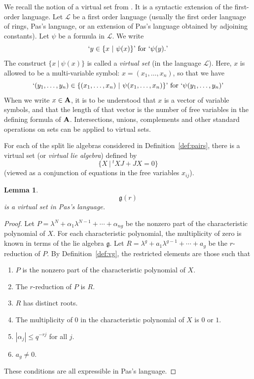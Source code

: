 \documentclass[11pt]{amsart}
\newtheorem{lemma}[theorem]{Lemma}
\theoremstyle{definition}
\theoremstyle{remark}
\numberwithin{equation}{theorem}
\def\calL{{\mathcal{L}}}
\def\tq{{\ \vert\ }}
\def\lie#1{{\mathfrak{#1}}}
\def\liegood#1{{\lie#1}}
\def\rq{\text{'}}
\begin{document}
We recall the notion of a virtual set from \cite{VTF}.  It is a
syntactic extension of the first-order language.  Let $\calL$ be a
first order language (usually the first order language of rings,
Pas's language, or an extension of Pas's language obtained by
adjoining constants).  Let $\psi$ be a formula in $\calL$. We
write
    \begin{equation}`y\in \{x \tq \psi(x)\}\rq \text{ for }
`\psi(y).\rq\end{equation} The construct $\{x\tq \psi(x)\}$ is
called a {\it virtual set} (in the language $\calL$). Here, $x$ is
allowed to be a multi-variable symbol:
    $x = (x_1,\ldots,x_n)$, so that we have
    \begin{equation}
    `(y_1,\ldots,y_n)\in \{(x_1,\ldots,x_n) \tq \psi(x_1,\ldots,x_n)\}\rq
    \text { for }
    `\psi(y_1,\ldots,y_n)\rq
    \end{equation}
When we write $x\in {\bf A}$, it is to be understood that $x$ is a
vector of variable symbols, and that the length of that vector is
the number of free variables in the defining formula of ${\bf A}$.
Intersections, unions, complements and other standard operations
on sets can be applied to virtual sets.


For each of the split lie algebras considered in
Definition~\ref{def:pairs}, there is a virtual set (or {\it virtual
lie algebra\/}) defined by
   \begin{equation}\{X\tq {}^tX J + J X = 0\}\end{equation}
(viewed as a conjunction of equations in the free variables
$x_{ij}$).

\begin{lemma} \label{lemma:pas}
\begin{equation}\liegood{g}(r)\end{equation} is a virtual set in Pas's
language.
\end{lemma}


\begin{proof}
Let $P = \lambda^N + \alpha_1\lambda^{N-1} + \cdots + \alpha_{ng}$
be the nonzero part of the characteristic polynomial of $X$. For
each characteristic polynomial, the multiplicity of zero is known
in terms of the lie algebra $\lie{g}$.  Let $R = \lambda^g +
a_1\lambda^{g-1} + \cdots + a_g$ be the $r$-reduction of $P$. By
Definition~\ref{def:vg}, the restricted  elements are those such
that
   \begin{enumerate}
      \item $P$ is the nonzero part of the characteristic
      polynomial of $X$.
      \item The $r$-reduction of $P$ is $R$.
      \item $R$ has distinct roots.
      \item The multiplicity of $0$ in the characteristic
      polynomial of $X$ is $0$ or $1$.
      \item $|\alpha_{j}|\le q^{-rj}$ for all $j$.
      \item $a_g\ne 0$.
   \end{enumerate}
These conditions are all expressible in Pas's language.
\end{proof}
\end{document}
